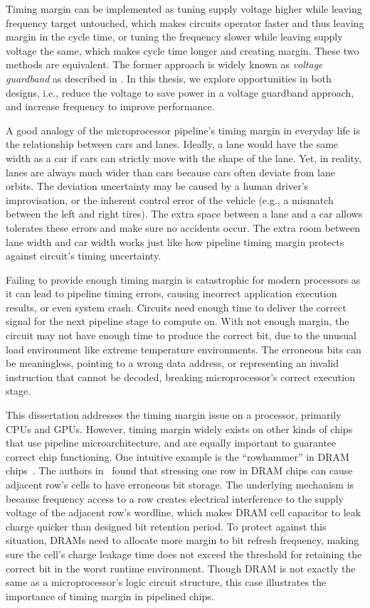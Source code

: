 Timing margin can be implemented as tuning supply voltage higher while leaving frequency target untouched, which makes circuits operator faster and thus leaving margin in the cycle time, or tuning the frequency slower while leaving supply voltage the same, which makes cycle time longer and creating margin. These two methods are equivalent. The former approach is widely known as \textit{voltage guardband} as described in . In this thesis, we explore opportunities in both designs, i.e., reduce the voltage to save power in a voltage guardband approach, and increase frequency to improve performance.

A good analogy of the microprocessor pipeline's timing margin in everyday life is the relationship between cars and lanes. Ideally, a lane would have the same width as a car if cars can strictly move with the shape of the lane. Yet, in reality, lanes are always much wider than cars because cars often deviate from lane orbits. The deviation uncertainty may be caused by a human driver's improvisation, or the inherent control error of the vehicle (e.g., a mismatch between the left and right tires). The extra space between a lane and a car allows tolerates these errors and make sure no accidents occur. The extra room between lane width and car width works just like how pipeline timing margin protects against circuit's timing uncertainty.

Failing to provide enough timing margin is catastrophic for modern processors as it can lead to pipeline timing errors, causing incorrect application execution results, or even system crash. Circuits need enough time to deliver the correct signal for the next pipeline stage to compute on. With not enough margin, the circuit may not have enough time to produce the correct bit, due to the unusual load environment like extreme temperature environments. The erroneous bits can be meaningless, pointing to a wrong data address, or representing an invalid instruction that cannot be decoded, breaking microprocessor's correct execution stage.

This dissertation addresses the timing margin issue on a processor, primarily CPUs and GPUs. However, timing margin widely exists on other kinds of chips that use pipeline microarchitecture, and are equally important to guarantee correct chip functioning. One intuitive example is the ``rowhammer'' in DRAM chips~\cite{kim2014flipping}. The authors in~\cite{kim2014flipping} found that stressing one row in DRAM chips can cause adjacent row's cells to have erroneous bit storage. The underlying mechanism is because frequency access to a row creates electrical interference to the supply voltage of the adjacent row's wordline, which makes DRAM cell capacitor to leak charge quicker than designed bit retention period. To protect against this situation, DRAMs need to allocate more margin to bit refresh frequency, making sure the cell's charge leakage time does not exceed the threshold for retaining the correct bit in the worst runtime environment. Though DRAM is not exactly the same as a microprocessor's logic circuit structure, this case illustrates the importance of timing margin in pipelined chips.


